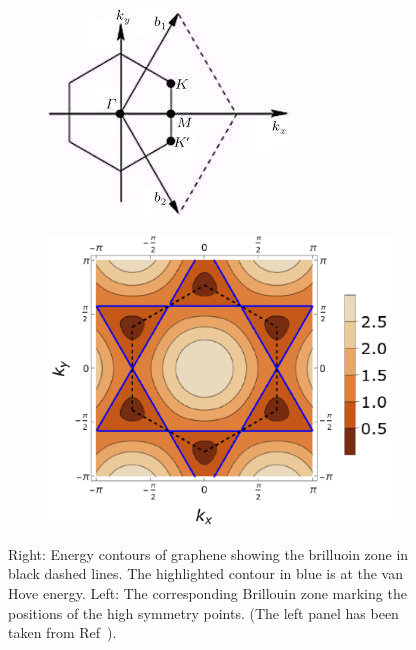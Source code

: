     \begin{figure}
 	\centering
	\begin{subfigure}[c]{0.32\linewidth}
		\centering
		\includegraphics[width=\linewidth]{figures/introduction/brilluoinzonegraphene.png}
	\end{subfigure}
	\begin{subfigure}[c]{0.65\linewidth}
		\centering
		\includegraphics[width=\linewidth]{figures/introduction/graphenecontoursv2.pdf}
	\end{subfigure}
	\caption{Right: Energy contours of graphene showing the brilluoin zone in black dashed lines. The highlighted contour in blue is at the van Hove energy.  Left: The corresponding Brillouin zone marking the positions of the high symmetry points. (The left panel has been taken from Ref~\cite{neto2009electronic}).}
    \label{fig:Brillouin zone of graphene}
\end{figure}

